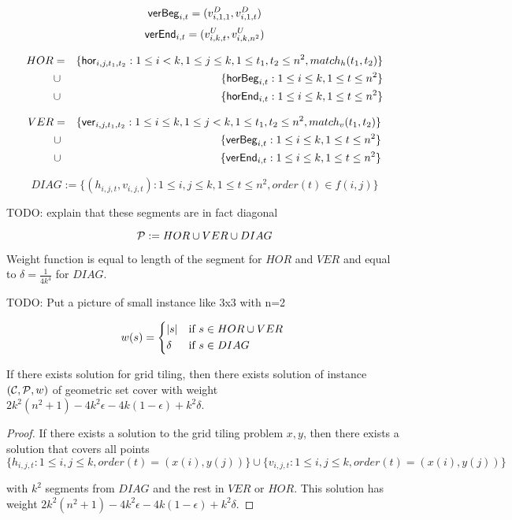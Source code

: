 $$\mathsf{verBeg}_{i,t} = (v^D_{i, 1, 1}, v^D_{i, 1, t})$$
$$\mathsf{verEnd}_{i,t} = (v^U_{i, k, t}, v^U_{i, k, n^2})$$

\begin{eqnarray*}
HOR &= &\{\mathsf{hor}_{i,j,t_1,t_2} : 1 \le i < k, 1 \le j \le k,
1 \le t_1, t_2 \le n^2, match_h(t_1, t_2)\} \\
&\cup &\{\mathsf{horBeg}_{i,t} : 1 \le i \le k, 1 \le t \le n^2\}
\\
&\cup &\{\mathsf{horEnd}_{i,t} : 1 \le i \le k, 1 \le t \le n^2\}
\end{eqnarray*}

\begin{eqnarray*}
VER &= &\{\mathsf{ver}_{i,j,t_1,t_2} : 1 \le i \le k, 1 \le j < k,
1 \le t_1, t_2 \le n^2, match_v(t_1, t_2)\} \\
&\cup &\{\mathsf{verBeg}_{i,t} : 1 \le i \le k, 1 \le t \le n^2\}
\\
&\cup &\{\mathsf{verEnd}_{i,t} : 1 \le i \le k, 1 \le t \le n^2\}
\end{eqnarray*}

$$DIAG := \{ (h_{i, j, t}, v_{i, j, t}) :
	1 \le i, j \le k, 1 \le t \le n^2, order(t) \in f(i, j)\}$$

TODO: explain that these segments are in fact diagonal

$$\mathcal{P} := HOR \cup VER \cup DIAG$$

Weight function is equal to length of the segment for $HOR$ and $VER$
and equal to $\delta = \frac{1}{4k^4}$ for $DIAG$.

TODO: Put a picture of small instance like 3x3 with n=2

\begin{equation}
w(s) =
	\begin{cases*}
	  |s| 			& if $s \in HOR \cup VER$ \\
	  \delta        & if $s \in DIAG$
	\end{cases*}
\end{equation}

\newcommand{\solWeight}{2k^2(n^2+1) - 4k^2\epsilon -4k(1-\epsilon) +k^2\delta }

\begin{lemma}
\label{set_cover_solution_exists}
	If there exists solution for grid tiling,
	then there exists solution of instance $(\mathcal{C}, \mathcal{P}, w)$
	of geometric set cover
	with weight $\solWeight$.
\end{lemma}

\begin{proof}
	If there exists a solution to the grid tiling problem
	$x, y$,
	then there exists a solution that covers
	all points
	$$\{h_{i, j, t} : 1 \le i, j \le k, order(t)=(x(i), y(j))\}
	\cup \{v_{i, j, t} : 1 \le i, j \le k, order(t)=(x(i), y(j))\}$$
	
	with $k^2$ segments from $DIAG$
	and the rest in $VER$ or $HOR$.
	This solution has weight $\solWeight$.
\end{proof}


